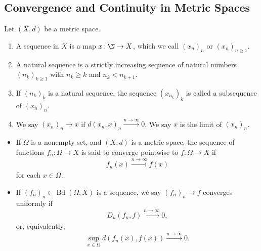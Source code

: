 \subsection{Convergence and Continuity in Metric Spaces}%
\begin{definition}
  Let $\left(X,d\right)$ be a metric space.
  \begin{enumerate}[(1)]
    \item A sequence in $X$ is a map $x\colon \N\rightarrow X$, which we call $\left(x_{n}\right)_{n}$ or $\left(x_{n}\right)_{n\geq 1}$.
    \item A natural sequence is a strictly increasing sequence of natural numbers $\left(n_{k}\right)_{k\geq 1}$ with $n_{k}\geq k$ and $n_{k} < n_{k+1}$.
    \item If $\left(n_k\right)_{k}$ is a natural sequence, the sequence $\left(x_{n_k}\right)_{k}$ is called a subsequence of $\left(x_{n}\right)_n$.
    \item We say $\left(x_n\right)_n\rightarrow x$ if $d\left(x_n,x\right)_{n} \xrightarrow{n\rightarrow\infty} 0$. We say $x$ is the limit of $\left(x_n\right)_n$.
  \end{enumerate}
\end{definition}
\begin{example}
  \begin{itemize}
    \item If $\Omega$ is a nonempty set, and $\left(X,d\right)$ is a metric space, the sequence of functions $f_n\colon \Omega\rightarrow X$ is said to converge pointwise to $f\colon \Omega\rightarrow X$ if
      \begin{align*}
        f_n\left(x\right)\xrightarrow{n\rightarrow\infty}f(x)
      \end{align*}
      for each $x\in \Omega$.
    \item If $\left(f_n\right)_n\in \operatorname{Bd}\left(\Omega,X\right)$ is a sequence, we say $\left(f_n\right)_n\rightarrow f$ converges uniformly if
      \begin{align*}
        D_u\left(f_n,f\right)\xrightarrow{n\rightarrow\infty}0,
      \end{align*}
      or, equivalently,
      \begin{align*}
        \sup_{x\in\Omega}d\left(f_n(x),f(x)\right)\xrightarrow{n\rightarrow\infty}0.
      \end{align*}
  \end{itemize}
\end{example}
